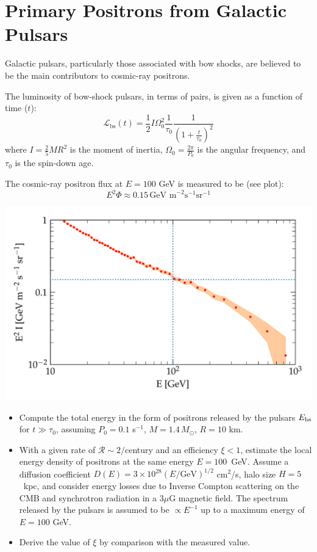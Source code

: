 \section{Primary Positrons from Galactic Pulsars}

Galactic pulsars, particularly those associated with bow shocks, are believed to be the main contributors to cosmic-ray positrons. 

The luminosity of bow-shock pulsars, in terms of pairs, is given as a function of time (\(t\)):
%
\[\mathcal{L}_{\text{bs}}(t) = \frac{1}{2} I \Omega_0^2 \frac{1}{\tau_0} \frac{1}{\left(1+\frac{t}{\tau_0}\right)^2}\]
%
where $I = \frac{2}{5} M R^2$ is the moment of inertia, $\Omega_0 = \frac{2\pi}{P_0}$ is the angular frequency, and $\tau_0$ is the spin-down age.

The cosmic-ray positron flux at \(E = 100\) GeV is measured to be (see plot):
%
\[E^2 \Phi \approx 0.15 \, \text{GeV m}^{-2} \text{s}^{-1} \text{sr}^{-1}\]
%
\begin{center}
\includegraphics[scale=0.25]{figures/ex_positrons.pdf}
\end{center}

\begin{itemize}
\item Compute the total energy in the form of positrons released by the pulsars \( E_{\rm bs}\) for \(t \gg \tau_0\), assuming \( P_0 = 0.1\) s\(^{-1}\), $M = 1.4 \, M_\odot$, $R = 10$ km.
\item With a given rate of \(\mathcal{R} \sim 2/\)century and an efficiency \(\xi < 1\), estimate the local energy density of positrons at the same energy $E = 100$~GeV. Assume a diffusion coefficient \(D(E) = 3 \times 10^{28} (E/\text{GeV})^{1/2}\) cm\(^2\)/s, halo size \( H = 5 \)~kpc, and consider energy losses due to Inverse Compton scattering on the CMB and synchrotron radiation in a \(3 \mu\)G magnetic field.
The spectrum released by the pulsars is assumed to be $\propto E^{-1}$ up to a maximum energy of $E = 100$ GeV.

\item Derive the value of \(\xi\) by comparison with the measured value.

\end{itemize}

